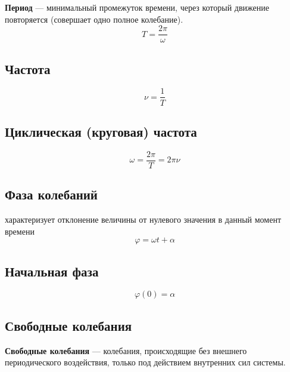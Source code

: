 \documentclass[a4paper,12pt]{article}
\begin{document}
\begin{definitionbox}
\textbf{Период} — минимальный промежуток времени, через который движение повторяется (совершает одно полное колебание).
\[
T=\frac{2\pi}{\omega}
\]
\end{definitionbox}

\vspace{0.8em}
 

\begin{definitionbox}
\subsection*{Частота}
\[
\nu=\frac{1}{T}
\]
\end{definitionbox}

\vspace{0.8em}
 

\begin{definitionbox}
\subsection*{Циклическая (круговая) частота}
\[
\omega=\frac{2\pi}{T}=2\pi\nu
\]
\end{definitionbox}

\vspace{0.8em}
 

\begin{definitionbox}
\subsection*{Фаза колебаний}
характеризует отклонение величины от нулевого значения в данный момент времени
\[
\varphi=\omega t+\alpha
\]
\end{definitionbox}

\begin{definitionbox}
\subsection*{Начальная фаза}
\[
\varphi(0)=\alpha
\]
\end{definitionbox}

\vspace{0.8em}

\subsection*{Свободные колебания}

\begin{definitionbox}
\textbf{Свободные колебания} — колебания, происходящие без внешнего периодического воздействия, только под действием внутренних сил системы.
\end{definitionbox}
\end{document}
